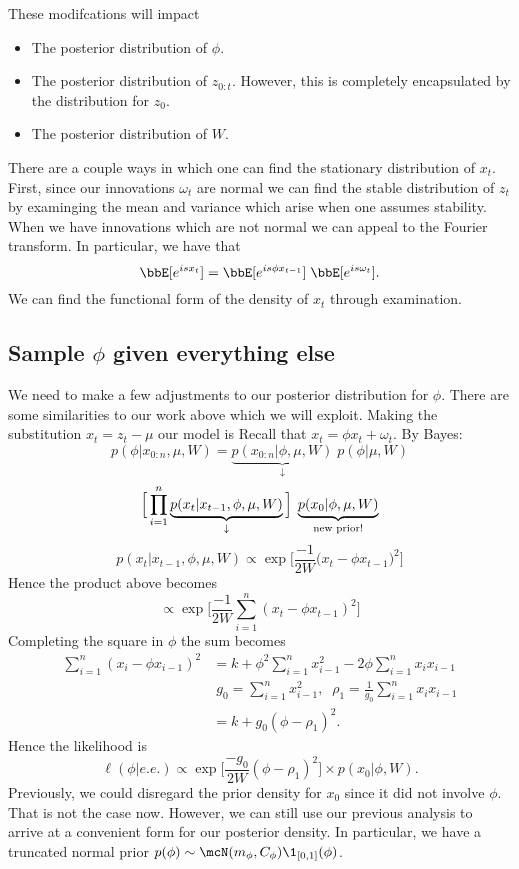 \documentclass{article}
\begin{document}
These modifcations will impact
\begin{itemize}
\item The posterior distribution of $\phi$.
\item The posterior distribution of $z_{0:t}$.  However, this is completely encapsulated by the distribution for $z_{0}$.
\item The posterior distribution of $W$.
\end{itemize}

\begin{aside}
There are a couple ways in which one can find the stationary distribution of $x_t$.  First, since our innovations $\omega_t$ are normal we can find the stable distribution of $z_t$ by examinging the mean and variance which arise when one assumes stability.  When we have innovations which are not normal we can appeal to the Fourier transform.  In particular, we have that
\[
\bbE[e^{i s x_t}] = \bbE[e^{i s \phi x_{t-1}}] \; \bbE[e^{i s \omega_t}].
\]
We can find the functional form of the density of $x_t$ through examination.
\end{aside}

\subsection{Sample $\phi$ given everything else}

We need to make a few adjustments to our posterior distribution for $\phi$.  There are some similarities to our work above which we will exploit.  Making the substitution $x_t = z_t - \mu$ our model is
Recall that $x_t = \phi x_t + \omega_t$.  By Bayes:
\[
p(\phi | x_{0:n}, \mu, W) = 
\underbrace{p(x_{0:n} | \phi, \mu, W)}_{\downarrow}
\;  p(\phi | \mu, W)
\]
\[
\Big[ \prod_{i=1}^n \underbrace{p(x_t | x_{t-1}, \phi, \mu, W)}_{\downarrow} \Big]
\; \underbrace{ p(x_0 | \phi, \mu, W)}_{\textmd{new prior!}}
\]
\[
p(x_t | x_{t-1}, \phi, \mu, W) \propto \exp \Big[ \frac{-1}{2W} \Big( x_t -  \phi x_{t-1} \Big)^2 \Big]
\]
Hence the product above becomes
\[
\propto \exp \Big[ \frac{-1}{2W} \sum_{i=1}^n ( x_t - \phi x_{t-1} )^2 \Big]
\]
Completing the square in $\phi$ the sum becomes
\begin{align*}
\sum_{i=1}^n (x_i - \phi x_{i-1})^2 
& = k + \phi^2 \sum_{i=1}^n x_{i-1}^2 - 2 \phi \sum_{i=1}^n x_i x_{i-1} \\
& \; g_0 = \sum_{i=1}^n x_{i-1}^2, \;\;   
\rho_1 = \frac{1}{g_0} \sum_{i=1}^n x_i x_{i-1} \\
& = k + g_0 ( \phi - \rho_1 )^2.
\end{align*}
Hence the likelihood is
\[
\ell(\phi | e.e.) \propto \exp \Big[ \frac{-g_0}{2W} (\phi - \rho_1)^2 \Big] \times p(x_0 | \phi, W).
\]
Previously, we could disregard the prior density for $x_0$ since it did not involve $\phi$.  That is not the case now.  However, we can still use our previous analysis to arrive at a convenient form for our posterior density.  In particular, we have a truncated normal prior $p(\phi) \sim \mcN(m_\phi, C_\phi) \1_{[0,1]}(\phi)$.
\end{document}
